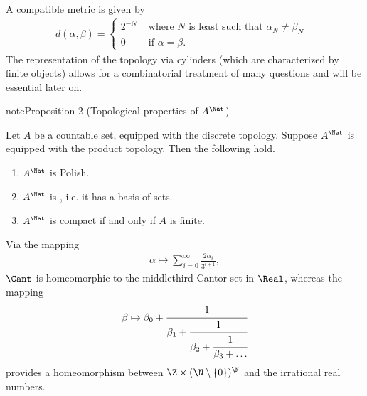 \documentclass[letterpaper,10pt,english]{jupyterBook}
\begin{document}
\sphinxAtStartPar
A compatible metric is given by
\begin{equation*}
\begin{split}
d(\alpha,\beta) = \begin{cases}
    2^{-N} & \text{ where } N \text{ is least such that $\alpha_N \neq \beta_N$ }\\
    0 & \text{ if $\alpha = \beta$}.
\end{cases}
\end{split}
\end{equation*}
\sphinxAtStartPar
The representation of the topology via cylinders (which are characterized by finite objects) allows for a combinatorial treatment of many questions and will be essential later on.
\label{polish:prop-topological-product}
\begin{sphinxadmonition}{note}{Proposition 2 (Topological properties of \protect\(A^\Nat\protect\))}



\sphinxAtStartPar
Let \(A\) be a countable set, equipped with the discrete topology. Suppose \(A^\Nat\) is equipped with the product topology. Then the following hold.
\begin{enumerate}
%
\item {} 
\sphinxAtStartPar
\(A^\Nat\) is Polish.

\item {} 
\sphinxAtStartPar
\(A^\Nat\) is , i.e. it has a basis of  sets.

\item {} 
\sphinxAtStartPar
\(A^\Nat\) is compact if and only if \(A\) is finite.

\end{enumerate}
\end{sphinxadmonition}

\sphinxAtStartPar
Via the mapping
\begin{equation*}
\begin{split}
\alpha \mapsto \sum_{i = 0}^\infty \frac{2\alpha_i}{3^{i+1}},
\end{split}
\end{equation*}\label{\detokenize{polish:fact-paths-as-reals}}
\sphinxAtStartPar
\(\Cant\) is homeomorphic to the middle\sphinxhyphen{}third Cantor set in \(\Real\), whereas the  mapping
\begin{equation*}
\begin{split}
\beta \mapsto \beta_0 + \cfrac{1}
        {\beta_1 + \cfrac{1}{
                \beta_2 + \cfrac{1}{
                        \beta_3 + \ldots}}}
\end{split}
\end{equation*}
\sphinxAtStartPar
provides a homeomorphism between \(\Z \times (\N\setminus\{0\})^\N\) and the irrational real numbers.
\end{document}
